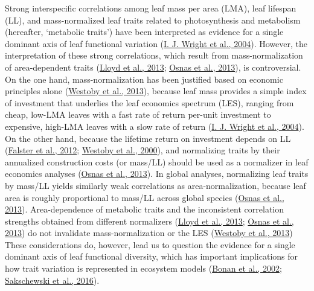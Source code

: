 \documentclass[
  12pt,
  a4paper,
,tablecaptionabove
]{scrartcl}
\begin{document}
Strong interspecific correlations among leaf mass per area (LMA), leaf
lifespan (LL), and mass-normalized leaf traits related to photosynthesis
and metabolism (hereafter, `metabolic traits') have been interpreted as
evidence for a single dominant axis of leaf functional variation
(\protect\hyperlink{ref-Wright2004a}{I. J. Wright et al., 2004}).
However, the interpretation of these strong correlations, which result
from mass-normalization of area-dependent traits
(\protect\hyperlink{ref-Lloyd2013}{Lloyd et al., 2013};
\protect\hyperlink{ref-Osnas2013}{Osnas et al., 2013}), is
controversial. On the one hand, mass-normalization has been justified
based on economic principles alone
(\protect\hyperlink{ref-Westoby2013}{Westoby et al., 2013}), because
leaf mass provides a simple index of investment that underlies the leaf
economics spectrum (LES), ranging from cheap, low-LMA leaves with a fast
rate of return per-unit investment to expensive, high-LMA leaves with a
slow rate of return (\protect\hyperlink{ref-Wright2004a}{I. J. Wright et
al., 2004}). On the other hand, because the lifetime return on
investment depends on LL (\protect\hyperlink{ref-Falster2012}{Falster et
al., 2012}; \protect\hyperlink{ref-Westoby2000}{Westoby et al., 2000}),
and normalizing traits by their annualized construction costs (or
mass/LL) should be used as a normalizer in leaf economics analyses
(\protect\hyperlink{ref-Osnas2013}{Osnas et al., 2013}). In global
analyses, normalizing leaf traits by mass/LL yields similarly weak
correlations as area-normalization, because leaf area is roughly
proportional to mass/LL across global species
(\protect\hyperlink{ref-Osnas2013}{Osnas et al., 2013}). Area-dependence
of metabolic traits and the inconsistent correlation strengths obtained
from different normalizers (\protect\hyperlink{ref-Lloyd2013}{Lloyd et
al., 2013}; \protect\hyperlink{ref-Osnas2013}{Osnas et al., 2013}) do
not invalidate mass-normalization or the LES
(\protect\hyperlink{ref-Westoby2013}{Westoby et al., 2013}) These
considerations do, however, lead us to question the evidence for a
single dominant axis of leaf functional diversity, which has important
implications for how trait variation is represented in ecosystem models
(\protect\hyperlink{ref-Bonan2002}{Bonan et al., 2002};
\protect\hyperlink{ref-Sakschewski2016}{Sakschewski et al., 2016}).
\end{document}
